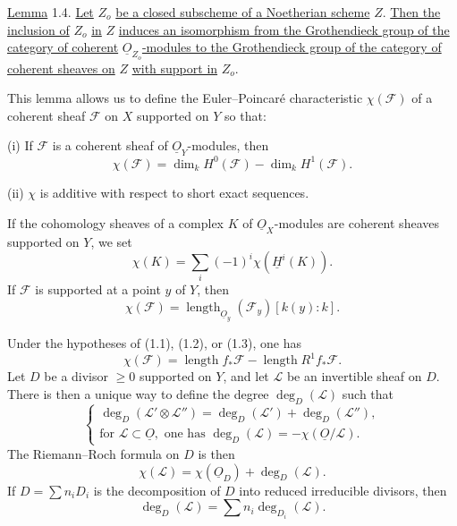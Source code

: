 \underline{Lemma} 1.4. \underline{Let} $Z_o$ \underline{be a closed subscheme of a
Noetherian scheme} $Z$. \underline{Then the inclusion of} $Z_o$ \underline{in} $Z$
\underline{induces an isomorphism from the Grothendieck group of the category of
coherent} $\underline{O}_{Z_o}$\underline{-modules to the Grothendieck group of the
category of coherent sheaves on} $Z$ \underline{with support in} $Z_o$.

This lemma allows us to define the Euler--Poincaré characteristic $\chi(\mathcal F)$
of a coherent sheaf $\mathcal F$ on $X$ supported on $Y$ so that:

(i) If $\mathcal F$ is a coherent sheaf of $\underline{O}_Y$-modules, then
\begin{equation}\tag{1.4.1}
\chi(\mathcal F)=\dim_k H^0(\mathcal F)-\dim_k H^1(\mathcal F).
\end{equation}

(ii) $\chi$ is additive with respect to short exact sequences.

If the cohomology sheaves of a complex $K$ of $\underline{O}_X$-modules are coherent
sheaves supported on $Y$, we set
\begin{equation}\tag{1.4.2}
\chi(K)=\sum_i(-1)^i\chi(\underline{H}^i(K)).
\end{equation}
If $\mathcal F$ is supported at a point $y$ of $Y$, then
\begin{equation}\tag{1.4.3}
\chi(\mathcal F)=\operatorname{length}_{\underline{O}_y}(\mathcal F_y)[k(y):k].
\end{equation}


Under the hypotheses of (1.1), (1.2), or (1.3), one has
\begin{equation}\tag{1.4.4}
\chi(\mathcal F)=\operatorname{length}f_*\mathcal F-
\operatorname{length}R^1f_*\mathcal F.
\end{equation}
Let $D$ be a divisor $\geq0$ supported on $Y$, and let $\mathcal L$ be an invertible
sheaf on $D$.  There is then a unique way to define the degree
$\deg_D(\mathcal L)$ such that
\begin{equation}\tag{1.4.5}
\left\{
\begin{array}{l}
\deg_D(\mathcal L'\otimes\mathcal L'')=
\deg_D(\mathcal L')+\deg_D(\mathcal L''),\\[3ex]
\text{for }\mathcal L\subset\underline O,
\text{ one has }\deg_D(\mathcal L)=-\chi(\underline O/\mathcal L).
\end{array}
\right.
\end{equation}
The Riemann--Roch formula on $D$ is then
\begin{equation}\tag{1.4.6}
\chi(\mathcal L)=\chi(\underline{O}_D)+\deg_D(\mathcal L).
\end{equation}
If $D=\sum n_iD_i$ is the decomposition of $D$ into reduced irreducible divisors,
then
\begin{equation}\tag{1.4.7}
\deg_D(\mathcal L)=\sum n_i\deg_{D_i}(\mathcal L).
\end{equation}

